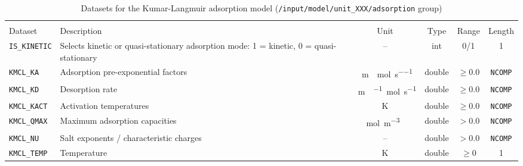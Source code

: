 \begin{table}[!ht]
\footnotesize
\begin{tabu}to \linewidth[m]{lX[m]cccc} \toprule
{} \\
\rowfont[c]\normalfont Dataset & Description & Unit & Type & Range & Length \everyrow{\midrule}\\
\texttt{IS\_KINETIC} & Selects kinetic or quasi-stationary adsorption mode: 1 = kinetic, 0 = quasi-stationary & -- & int & 0/1 & 1\\
\texttt{KMCL\_KA} & Adsorption pre-exponential factors & \si{\metre{}\per\mol\per\second} & double & $\geq 0.0$ & \texttt{NCOMP}\\
\texttt{KMCL\_KD} & Desorption rate & \si{\metre{}\per{}\mol\per\second} & double & $\geq 0.0$ & \texttt{NCOMP}\\
\texttt{KMCL\_KACT} & Activation temperatures & \si{\kelvin} & double & $\geq 0.0$ & \texttt{NCOMP}\\
\texttt{KMCL\_QMAX} & Maximum adsorption capacities & \si{\mol\per\cubic\metre{}} & double & $> 0.0$ & \texttt{NCOMP}\\
\texttt{KMCL\_NU} & Salt exponents / characteristic charges & -- & double & $> 0.0$ & \texttt{NCOMP}\\
\texttt{KMCL\_TEMP} & Temperature & \si{\kelvin} & double & $\geq 0$ & 1 \everyrow{}\\
\bottomrule
\end{tabu}
\caption[Datasets for the Kumar-Langmuir adsorption model]{\label{tab:FFAdsorptionKumarLangmuir}Datasets for the Kumar-Langmuir adsorption model (\texttt{/input/model/unit\_XXX/adsorption} group)}
\end{table}


